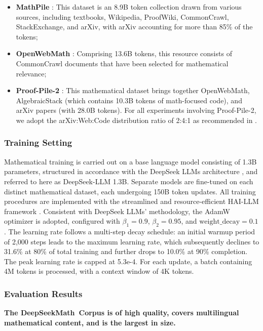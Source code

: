 \begin{itemize}[topsep=0pt]
\begin{itemize}[topsep=0pt]
    \item \textbf{MathPile} \citep{mathpile}: This dataset is an 8.9B token collection drawn from various sources, including textbooks, Wikipedia, ProofWiki, CommonCrawl, StackExchange, and arXiv, with arXiv accounting for more than 85\% of the tokens;
    \item \textbf{OpenWebMath} \citep{openwebmath}: Comprising 13.6B tokens, this resource consists of CommonCrawl documents that have been selected for mathematical relevance;
    \item \textbf{Proof-Pile-2} \citep{llemma}: This mathematical dataset brings together OpenWebMath, AlgebraicStack (which contains 10.3B tokens of math-focused code), and arXiv papers (with 28.0B tokens). For all experiments involving Proof-Pile-2, we adopt the arXiv:Web:Code distribution ratio of 2:4:1 as recommended in \cite{llemma}.
\end{itemize}

\subsubsection{Training Setting}
\label{sec:quality-policy}
Mathematical training is carried out on a base language model consisting of 1.3B parameters, structured in accordance with the DeepSeek LLMs architecture \citep{deepseek-llm}, and referred to here as DeepSeek-LLM 1.3B. Separate models are fine-tuned on each distinct mathematical dataset, each undergoing 150B token updates. All training procedures are implemented with the streamlined and resource-efficient HAI-LLM framework \citep{haillm}. Consistent with DeepSeek LLMs' methodology, the AdamW optimizer \citep{adamW} is adopted, configured with $\beta_1=0.9$, $\beta_2=0.95$, and $\mathrm{weight\_decay}=0.1$. The learning rate follows a multi-step decay schedule: an initial warmup period of 2,000 steps leads to the maximum learning rate, which subsequently declines to 31.6\% at 80\% of total training and further drops to 10.0\% at 90\% completion. The peak learning rate is capped at 5.3e-4. For each update, a batch containing 4M tokens is processed, with a context window of 4K tokens.

\subsubsection{Evaluation Results}

\textbf{The DeepSeekMath~Corpus is of high quality, covers multilingual mathematical content, and is the largest in size.}


\end{itemize}
